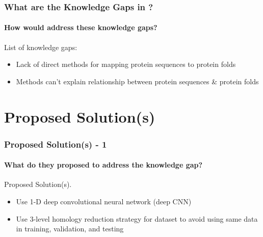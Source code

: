 \documentclass[xcolor={usenames,dvipsnames},hyperref={hyperindex,bookmarks}]{beamer}
\begin{document}







\frame
{
	\frametitle{What are the Knowledge Gaps in \cite{Hou2018}?}
	\framesubtitle{How would \cite{Hou2018} address these knowledge gaps?}

	List of knowledge gaps:
	\begin{itemize}
	\item Lack of direct methods for mapping protein sequences to protein folds
	\item Methods can't explain relationship between protein sequences \& protein folds
	\end{itemize}

}

























\section{Proposed Solution(s)}


\frame
{
	\frametitle{Proposed Solution(s) - 1}
	\framesubtitle{What do they proposed to address the knowledge gap?}

	Proposed Solution(s).
	\begin{itemize}
	\item Use 1-D deep convolutional neural network (deep CNN)
	\item Use 3-level homology reduction strategy for dataset to avoid using same data in training, validation, and testing
	\end{itemize}
}
\end{document}
